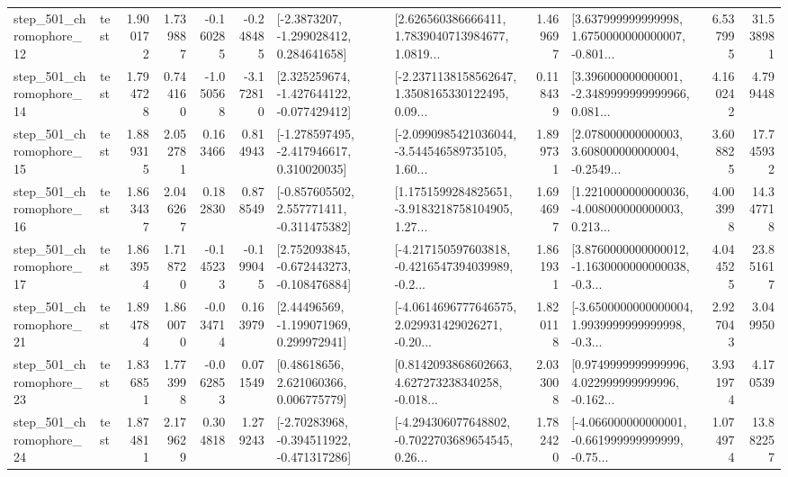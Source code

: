 \begin{tabular}{llrrrrllrlrr}
  step\_501\_chromophore\_12 &      test &      1.900172 &    1.739887 &     -0.160285 & -0.248485 &     [-2.3873207, -1.299028412, 0.284641658] &  [2.626560386666411, 1.7839040713984677, 1.0819... &       1.469697 &  [3.637999999999998, 1.6750000000000007, -0.801... &            6.537995 &         31.538981 \\
  step\_501\_chromophore\_14 &      test &      1.794728 &    0.744160 &     -1.050568 & -3.172810 &   [2.325259674, -1.427644122, -0.077429412] &  [-2.2371138158562647, 1.3508165330122495, 0.09... &       0.118439 &  [3.396000000000001, -2.3489999999999966, 0.081... &            4.160242 &          4.799448 \\
  step\_501\_chromophore\_15 &      test &      1.889315 &    2.052781 &      0.163466 &  0.814943 &   [-1.278597495, -2.417946617, 0.310020035] &  [-2.0990985421036044, -3.544546589735105, 1.60... &       1.899731 &  [2.078000000000003, 3.608000000000004, -0.2549... &            3.608825 &         17.745932 \\
  step\_501\_chromophore\_16 &      test &      1.863437 &    2.046267 &      0.182830 &  0.878549 &   [-0.857605502, 2.557771411, -0.311475382] &  [1.1751599284825651, -3.9183218758104905, 1.27... &       1.694697 &  [1.2210000000000036, -4.008000000000003, 0.213... &            4.003998 &         14.347718 \\
  step\_501\_chromophore\_17 &      test &      1.863954 &    1.718720 &     -0.145233 & -0.199045 &   [2.752093845, -0.672443273, -0.108476884] &  [-4.217150597603818, -0.4216547394039989, -0.2... &       1.861931 &  [3.8760000000000012, -1.1630000000000038, -0.3... &            4.044525 &         23.851617 \\
  step\_501\_chromophore\_21 &      test &      1.894784 &    1.860070 &     -0.034714 &  0.163979 &     [2.44496569, -1.199071969, 0.299972941] &  [-4.0614696777646575, 2.029931429026271, -0.20... &       1.820118 &  [-3.6500000000000004, 1.9939999999999998, -0.3... &            2.927043 &          3.049950 \\
  step\_501\_chromophore\_23 &      test &      1.836851 &    1.773998 &     -0.062853 &  0.071549 &      [0.48618656, 2.621060366, 0.006775779] &  [0.8142093868602663, 4.627273238340258, -0.018... &       2.033008 &  [0.9749999999999996, 4.022999999999996, -0.162... &            3.931974 &          4.170539 \\
  step\_501\_chromophore\_24 &      test &      1.874811 &    2.179629 &      0.304818 &  1.279243 &   [-2.70283968, -0.394511922, -0.471317286] &  [-4.294306077648802, -0.7022703689654545, 0.26... &       1.782420 &  [-4.066000000000001, -0.661999999999999, -0.75... &            1.074974 &         13.882257 \\

\end{tabular}
